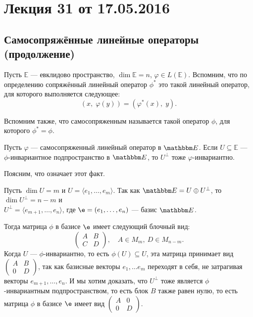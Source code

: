 


\section{Лекция 31 от 17.05.2016}

\subsection*{Самосопряжённые линейные операторы (продолжение)}

Пусть $\mathbb{E}$ --- евклидово пространство, $\dim \mathbb{E} = n$, $\varphi \in L(\mathbb{E})$. Вспомним, что по определению сопряжённый линейный оператор $\phi^*$ это такой линейный оператор, для которого выполняется следующее:
$$
(x,\;\varphi(y)) = (\varphi^*(x),\; y).
$$

Вспомним также, что самосопряженным называется такой оператор $\phi$, для которого $\phi^* = \phi$.

\begin{Suggestion}
	Пусть $\varphi$ --- самосопряженный линейный оператор в $\E$. Если $U \subseteq \mathbb{E}$ ---\\ $\phi$-инвариантное подпространство в $\E$, то $U^\perp$ тоже $\varphi$-инвариантно.
\end{Suggestion}

Поясним, что означает этот факт.
	 
Пусть $\dim U = m$ и $U = \langle e_1, \ldots, e_m \rangle$. Так как $\E = U \oplus U^\perp$, то $\dim U^\perp = n - m$ и \\$U^\perp = \langle e_{m+1}, \ldots, e_n\rangle$, где $\e = (e_1, \ldots, e_n)$ --- базис $\E$.
	 
Тогда матрица $\phi$ в базисе $\e$ имеет следующий блочный вид: 
$$
\begin{pmatrix}A & B \\ C & D\end{pmatrix}, \quad  A \in M_m,\ D \in M_{n-m}.
$$	 
Когда $U$ --- $\phi$-инвариантно, то есть $\phi(U) \subseteq U$, эта матрица принимает вид $\begin{pmatrix}A & B \\ 0 & D\end{pmatrix}$, так как базисные векторы $e_1,\ldots e_m$ переходят в себя, не затрагивая векторы $e_{m+1}, \ldots, e_n$. И мы хотим доказать, что $U^\perp$ тоже является $\phi$-инвариантным подпространством, то есть блок $B$ также равен нулю, то есть матрица $\phi$ в базисе $\e$ имеет вид $\begin{pmatrix}A & 0 \\ 0 & D\end{pmatrix}$.

